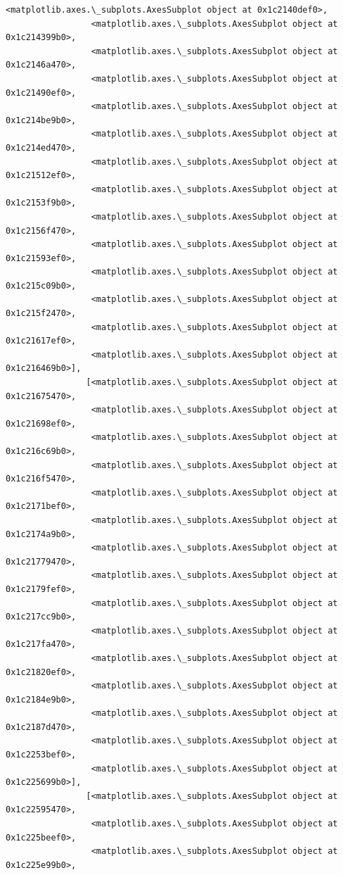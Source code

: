 \documentclass[11pt]{article}
\begin{document}
\begin{Verbatim}[commandchars=\\\{\}]
                 <matplotlib.axes.\_subplots.AxesSubplot object at 0x1c2140def0>,
                 <matplotlib.axes.\_subplots.AxesSubplot object at 0x1c214399b0>,
                 <matplotlib.axes.\_subplots.AxesSubplot object at 0x1c2146a470>,
                 <matplotlib.axes.\_subplots.AxesSubplot object at 0x1c21490ef0>,
                 <matplotlib.axes.\_subplots.AxesSubplot object at 0x1c214be9b0>,
                 <matplotlib.axes.\_subplots.AxesSubplot object at 0x1c214ed470>,
                 <matplotlib.axes.\_subplots.AxesSubplot object at 0x1c21512ef0>,
                 <matplotlib.axes.\_subplots.AxesSubplot object at 0x1c2153f9b0>,
                 <matplotlib.axes.\_subplots.AxesSubplot object at 0x1c2156f470>,
                 <matplotlib.axes.\_subplots.AxesSubplot object at 0x1c21593ef0>,
                 <matplotlib.axes.\_subplots.AxesSubplot object at 0x1c215c09b0>,
                 <matplotlib.axes.\_subplots.AxesSubplot object at 0x1c215f2470>,
                 <matplotlib.axes.\_subplots.AxesSubplot object at 0x1c21617ef0>,
                 <matplotlib.axes.\_subplots.AxesSubplot object at 0x1c216469b0>],
                [<matplotlib.axes.\_subplots.AxesSubplot object at 0x1c21675470>,
                 <matplotlib.axes.\_subplots.AxesSubplot object at 0x1c21698ef0>,
                 <matplotlib.axes.\_subplots.AxesSubplot object at 0x1c216c69b0>,
                 <matplotlib.axes.\_subplots.AxesSubplot object at 0x1c216f5470>,
                 <matplotlib.axes.\_subplots.AxesSubplot object at 0x1c2171bef0>,
                 <matplotlib.axes.\_subplots.AxesSubplot object at 0x1c2174a9b0>,
                 <matplotlib.axes.\_subplots.AxesSubplot object at 0x1c21779470>,
                 <matplotlib.axes.\_subplots.AxesSubplot object at 0x1c2179fef0>,
                 <matplotlib.axes.\_subplots.AxesSubplot object at 0x1c217cc9b0>,
                 <matplotlib.axes.\_subplots.AxesSubplot object at 0x1c217fa470>,
                 <matplotlib.axes.\_subplots.AxesSubplot object at 0x1c21820ef0>,
                 <matplotlib.axes.\_subplots.AxesSubplot object at 0x1c2184e9b0>,
                 <matplotlib.axes.\_subplots.AxesSubplot object at 0x1c2187d470>,
                 <matplotlib.axes.\_subplots.AxesSubplot object at 0x1c2253bef0>,
                 <matplotlib.axes.\_subplots.AxesSubplot object at 0x1c225699b0>],
                [<matplotlib.axes.\_subplots.AxesSubplot object at 0x1c22595470>,
                 <matplotlib.axes.\_subplots.AxesSubplot object at 0x1c225beef0>,
                 <matplotlib.axes.\_subplots.AxesSubplot object at 0x1c225e99b0>,

\end{Verbatim}
\end{document}
